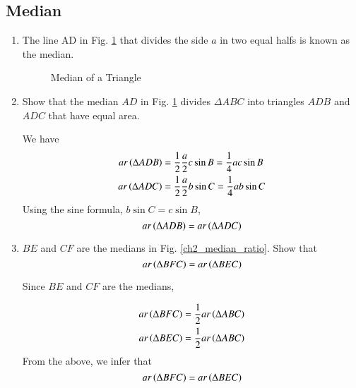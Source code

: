 %
\subsection{Median}
\renewcommand{\theequation}{\theenumi}
\begin{enumerate}[label=\arabic*.,ref=\thesubsection.\theenumi]

\item	The line AD in Fig. \ref{ch2_median_def} that divides the side $a$ in two equal halfs is known as the median.

\begin{figure}[!ht]
	\begin{center}
		
		\resizebox{\columnwidth}{!}{}
	\end{center}
	\caption{Median of a Triangle}
	\label{ch2_median_def}	
\end{figure}

\item
	Show that the median $AD$ in Fig. \ref{ch2_median_def} divides  $\Delta ABC$ into triangles $ADB$ and $ADC$ that have equal area.

\solution We have
%
\begin{align}
ar \left(\Delta ADB\right) &= \frac{1}{2}\frac{a}{2}c \sin B =  \frac{1}{4}ac \sin B \\
ar \left(\Delta ADC\right) &= \frac{1}{2}\frac{a}{2}b \sin C =  \frac{1}{4}ab \sin C 
\end{align}
%
Using the sine formula, $b \sin C = c \sin B$,
\begin{equation}
ar \left(\Delta ADB\right) = ar \left(\Delta ADC\right)
\end{equation}
\item
	$BE$ and $CF$ are the medians in Fig. \ref{ch2_median_ratio}.  Show that
	\begin{equation}
	ar \left(\Delta BFC\right) = ar \left(\Delta BEC\right)
	\end{equation} 
	\label{ch2_median_eq_tri}

\solution Since $BE$ and $CF$ are the medians, 

\begin{align}
ar \left(\Delta BFC\right) &= \frac{1}{2} ar \left(\Delta ABC\right) \\
ar \left(\Delta BEC\right) &= \frac{1}{2} ar \left(\Delta ABC\right) 
\end{align}
From the above, we infer that
%
\begin{equation}
ar \left(\Delta BFC\right) = ar \left(\Delta BEC\right)
\end{equation}



\end{enumerate}
